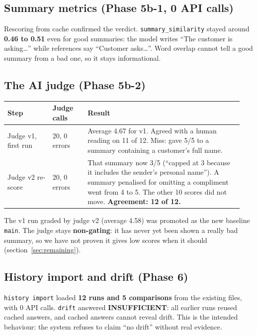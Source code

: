 \documentclass[11pt,a4paper]{article}
\newcommand{\code}[1]{\nolinkurl{#1}}
\begin{document}
\subsection{Summary metrics (Phase 5b-1, 0 API calls)}

Rescoring from cache confirmed the verdict. \code{summary_similarity} stayed around
\textbf{0.46 to 0.51} even for good summaries: the model writes ``The customer is
asking\ldots'' while references say ``Customer asks\ldots''. Word overlap cannot tell a good
summary from a bad one, so it stays informational.

\subsection{The AI judge (Phase 5b-2)}

\begin{longtable}{@{}p{0.18\linewidth}p{0.14\linewidth}p{0.62\linewidth}@{}}
\toprule
\textbf{Step} & \textbf{Judge calls} & \textbf{Result} \\
\midrule
\endhead
Judge v1, first run & 20, 0 errors & Average 4.67 for v1. Agreed with a human reading on 11 of 12. Miss: gave 5/5 to a summary containing a customer's full name. \\
Judge v2 re-score & 20, 0 errors & That summary now 3/5 (``capped at 3 because it includes the sender's personal name''). A summary penalised for omitting a compliment went from 4 to 5. The other 10 scores did not move. \textbf{Agreement: 12 of 12.} \\
\bottomrule
\end{longtable}

The v1 run graded by judge v2 (average 4.58) was promoted as the new baseline \code{main}.
The judge stays \textbf{non-gating}: it has never yet been shown a really bad summary, so we
have not proven it gives low scores when it should (section~\ref{sec:remaining}).

\subsection{History import and drift (Phase 6)}

\texttt{history import} loaded \textbf{12 runs and 5 comparisons} from the existing files, with
0 API calls. \texttt{drift} answered \textbf{INSUFFICIENT}: all earlier runs reused cached
answers, and cached answers cannot reveal drift. This is the intended behaviour: the system
refuses to claim ``no drift'' without real evidence.
\end{document}
